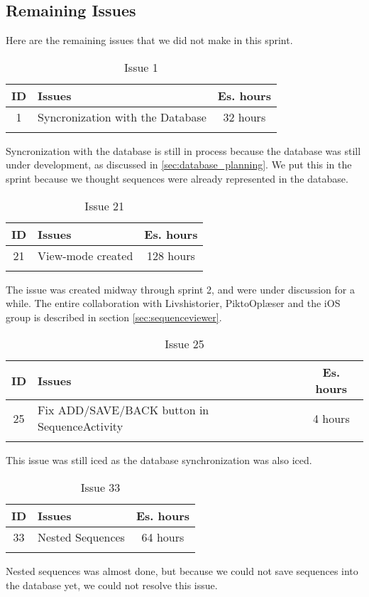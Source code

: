 \subsection{Remaining Issues}
\label{subsec:spr2_RemainingIssues}
Here are the remaining issues that we did not make in this sprint.

\begin{longtable} { | c | p{12cm} | c | } 
\hline
	ID 	&	Issues	&		 Es. hours \\\hline
	1	&	Syncronization with the Database 	&	32 hours	\\\hline
\caption{Issue 1}
\label{tab:spr2_syncwithdatabase}
\end{longtable}

Syncronization with the database is still in process because the database was still under development, as discussed in \ref{sec:database_planning}. We put this in the sprint because we thought sequences were already represented in the database.


\begin{longtable} { | c | p{12cm} | c | } 
\hline
	ID 	&	Issues	&		 Es. hours \\\hline
	21	&	View-mode created 	&	128 hours	\\\hline
\caption{Issue 21}
\label{tab:spr2_viewmodecreated}
\end{longtable}

The issue was created midway through sprint 2, and were under discussion for a while. The entire collaboration with Livshistorier, PiktoOplæser and the iOS group is described in section \ref{sec:sequenceviewer}.

\begin{longtable} { | c | p{12cm} | c | } 
\hline
	ID 	&	Issues	&		 Es. hours \\\hline
	25	&	Fix ADD/SAVE/BACK button in SequenceActivity 	&	4 hours	\\\hline
\caption{Issue 25}
\label{tab:spr2_addsavebackbuttons}
\end{longtable}

This issue was still iced as the database synchronization was also iced.

\begin{longtable} { | c | p{12cm} | c | } 
\hline
	ID 	&	Issues	&		 Es. hours \\\hline
	33	&	Nested Sequences 	&	64 hours	\\\hline
\caption{Issue 33}
\label{tab:spr2_nestedsequences}
\end{longtable}

Nested sequences was almost done, but because we could not save sequences into the database yet, we could not resolve this issue.